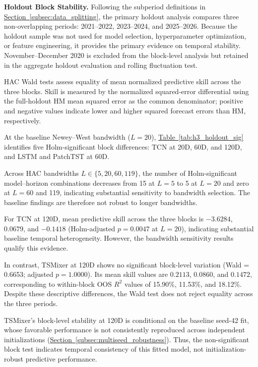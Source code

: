 \documentclass[runningheads,orivec]{llncs}
\begin{document}
\medskip
\noindent\textbf{Holdout Block Stability.}
Following the subperiod definitions in \hyperref[subsec:data_splitting]{Section~\ref*{subsec:data_splitting}}, the primary holdout analysis compares three non-overlapping periods: 2021--2022, 2023--2024, and 2025--2026. Because the holdout sample was not used for model selection, hyperparameter optimization, or feature engineering, it provides the primary evidence on temporal stability. November--December 2020 is excluded from the block-level analysis but retained in the aggregate holdout evaluation and rolling fluctuation test.

HAC Wald tests assess equality of mean normalized predictive skill across the three blocks. Skill is measured by the normalized squared-error differential using the full-holdout HM mean squared error as the common denominator; positive and negative values indicate lower and higher squared forecast errors than HM, respectively.

At the baseline Newey--West bandwidth ($L=20$), \hyperref[tab:h3_holdout_sig]{Table~\ref*{tab:h3_holdout_sig}} identifies five Holm-significant block differences: TCN at 20D, 60D, and 120D, and LSTM and PatchTST at 60D.

Across HAC bandwidths $L \in \{5,20,60,119\}$, the number of Holm-significant model--horizon combinations decreases from 15 at $L=5$ to 5 at $L=20$ and zero at $L=60$ and 119, indicating substantial sensitivity to bandwidth selection. The baseline findings are therefore not robust to longer bandwidths.

For TCN at 120D, mean predictive skill across the three blocks is $-3.6284$, $0.0679$, and $-0.1418$ (Holm-adjusted $p=0.0047$ at $L=20$), indicating substantial baseline temporal heterogeneity. However, the bandwidth sensitivity results qualify this evidence.

In contrast, TSMixer at 120D shows no significant block-level variation (Wald = 0.6653; adjusted $p=1.0000$). Its mean skill values are $0.2113$, $0.0860$, and $0.1472$, corresponding to within-block OOS $R^2$ values of 15.90\%, 11.53\%, and 18.12\%. Despite these descriptive differences, the Wald test does not reject equality across the three periods.

TSMixer's block-level stability at 120D is conditional on the baseline seed-42 fit, whose favorable performance is not consistently reproduced across independent initializations (\hyperref[subsec:multiseed_robustness]{Section~\ref*{subsec:multiseed_robustness}}). Thus, the non-significant block test indicates temporal consistency of this fitted model, not initialization-robust predictive performance.
\end{document}
